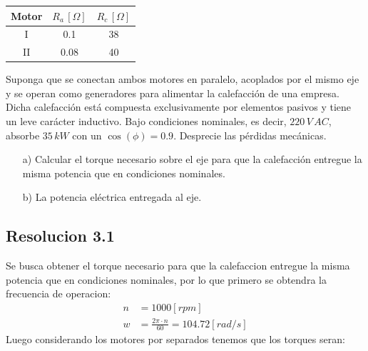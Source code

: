 \documentclass[
  11pt,
  letterpaper,
   addpoints,
   answers
  ]{exam}
\begin{document}
\begin{questions}
\begin{table}[H]
    \centering
    \begin{tabular}{|c|c|c|}
        \hline
        Motor & $R_a \, [\Omega]$ & $R_c \, [\Omega]$ \\
        \hline
        I & 0.1 & 38 \\
        II & 0.08 & 40 \\
        \hline
    \end{tabular}
\end{table}

Suponga que se conectan ambos motores en paralelo, acoplados por el mismo eje y se operan como generadores para alimentar la calefacción de una empresa. Dicha calefacción está compuesta exclusivamente por elementos pasivos y tiene un leve carácter inductivo. Bajo condiciones nominales, es decir, $220 \, V \, AC$, absorbe $35 \, kW$ con un $\cos(\phi) = 0.9$. Desprecie las pérdidas mecánicas.

\begin{enumerate}
    \item[a)] Calcular el torque necesario sobre el eje para que la calefacción entregue la misma potencia que en condiciones nominales.
    \item[b)] La potencia eléctrica entregada al eje.
\end{enumerate}
\begin{solution}
   \subsection*{Resolucion 3.1}
   Se busca obtener el torque necesario para que la calefaccion entregue la misma potencia que en condiciones nominales, por lo que primero se obtendra la frecuencia de operacion:
   \begin{align}
    n&= 1000 [rpm]\\
    w&= \frac{2\pi \cdot n}{60} = 104.72 [rad/s]
   \end{align}
   Luego considerando los motores por separados tenemos que los torques seran:

\end{solution}
\end{questions}
\end{document}
